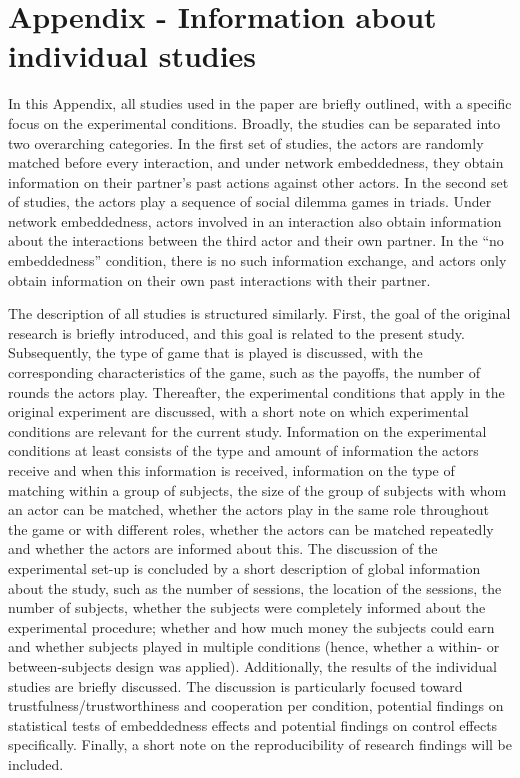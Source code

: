 \documentclass[
  11pt,
]{article}
\begin{document}
\newpage

\appendix

\hypertarget{AppA}{%
\section{Appendix - Information about individual studies}\label{AppA}}

\setlength{\parindent}{0.2in}
\setlength{\leftskip}{0in}

\noindent

In this Appendix, all studies used in the paper are briefly outlined, with a specific focus on the experimental conditions.
Broadly, the studies can be separated into two overarching categories.
In the first set of studies, the actors are randomly matched before every interaction, and under network embeddedness, they obtain information on their partner's past actions against other actors.
In the second set of studies, the actors play a sequence of social dilemma games in triads.
Under network embeddedness, actors involved in an interaction also obtain information about the interactions between the third actor and their own partner. In the ``no embeddedness'' condition, there is no such information exchange, and actors only obtain information on their own past interactions with their partner.

The description of all studies is structured similarly.
First, the goal of the original research is briefly introduced, and this goal is related to the present study.
Subsequently, the type of game that is played is discussed, with the corresponding characteristics of the game, such as the payoffs, the number of rounds the actors play.
Thereafter, the experimental conditions that apply in the original experiment are discussed, with a short note on which experimental conditions are relevant for the current study.
Information on the experimental conditions at least consists of the type and amount of information the actors receive and when this information is received, information on the type of matching within a group of subjects, the size of the group of subjects with whom an actor can be matched, whether the actors play in the same role throughout the game or with different roles, whether the actors can be matched repeatedly and whether the actors are informed about this.
The discussion of the experimental set-up is concluded by a short description of global information about the study, such as the number of sessions, the location of the sessions, the number of subjects, whether the subjects were completely informed about the experimental procedure; whether and how much money the subjects could earn and whether subjects played in multiple conditions (hence, whether a within- or between-subjects design was applied).
Additionally, the results of the individual studies are briefly discussed.
The discussion is particularly focused toward trustfulness/trustworthiness and cooperation per condition, potential findings on statistical tests of embeddedness effects and potential findings on control effects specifically.
Finally, a short note on the reproducibility of research findings will be included.
\end{document}

